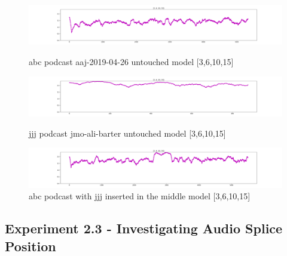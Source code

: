 \begin{figure}[htbp]
\begin{center}

\includegraphics[scale=0.2]{src/main-matter/results/experiment-age/entropy/audio_aug/[3,6,10,15]/abc}
\caption{abc podcast aaj-2019-04-26 untouched model [3,6,10,15]}

\includegraphics[scale=0.2]{src/main-matter/results/experiment-age/entropy/audio_aug/[3,6,10,15]/jjj}
\caption{jjj podcast jmo-ali-barter untouched model [3,6,10,15]}


\includegraphics[scale=0.2]{src/main-matter/results/experiment-age/entropy/audio_aug/[3,6,10,15]/abc-middle-jjj}
\caption{abc podcast with jjj inserted in the middle model [3,6,10,15]}

%


\label{default}
\end{center}
\end{figure}


\pagebreak



\subsection{Experiment 2.3 - Investigating Audio Splice Position}

